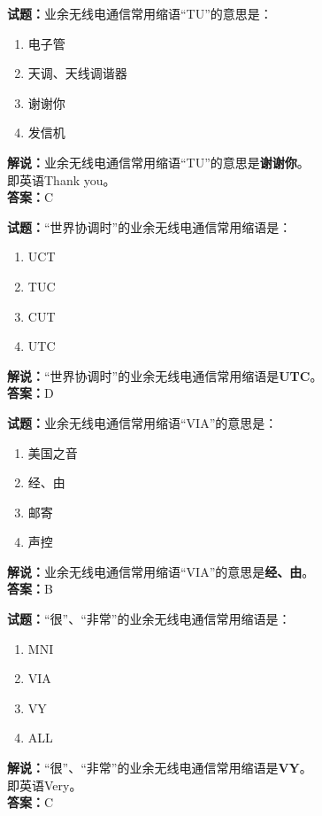 \documentclass{ctexbook}
\begin{document}
\bigskip


\noindent\textbf{试题：}业余无线电通信常用缩语“TU”的意思是：
\begin{enumerate}[leftmargin=3em]
\item 电子管
\item 天调、天线调谐器
\item 谢谢你
\item 发信机
\end{enumerate}
\noindent\textbf{解说：}业余无线电通信常用缩语“TU”的意思是\textbf{谢谢你}。\\即英语Thank you。\\\noindent\textbf{答案：}C




\bigskip


\noindent\textbf{试题：}“世界协调时”的业余无线电通信常用缩语是：
\begin{enumerate}[leftmargin=3em]
\item UCT
\item TUC
\item CUT
\item UTC
\end{enumerate}
\noindent\textbf{解说：}“世界协调时”的业余无线电通信常用缩语是\textbf{UTC}。\\\noindent\textbf{答案：}D



\bigskip


\noindent\textbf{试题：}业余无线电通信常用缩语“VIA”的意思是：
\begin{enumerate}[leftmargin=3em]
\item 美国之音%
\item 经、由
\item 邮寄
\item 声控
\end{enumerate}
\noindent\textbf{解说：}业余无线电通信常用缩语“VIA”的意思是\textbf{经、由}。\\\noindent\textbf{答案：}B


\bigskip


\noindent\textbf{试题：}“很”、“非常”的业余无线电通信常用缩语是：
\begin{enumerate}[leftmargin=3em]
\item MNI
\item VIA
\item VY
\item ALL
\end{enumerate}
\noindent\textbf{解说：}“很”、“非常”的业余无线电通信常用缩语是\textbf{VY}。\\即英语Very。\\\noindent\textbf{答案：}C
\end{document}
